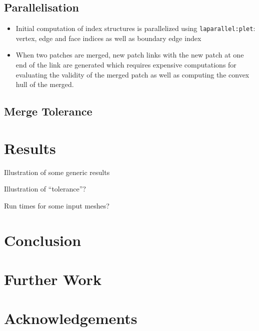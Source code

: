 \documentclass[format=sigconf]{acmart}
\begin{document}
\subsection{Parallelisation}

\begin{itemize}
\item Initial computation of index structures is parallelized using \texttt{laparallel:plet}: vertex, edge and face indices as well as boundary edge index
\item When two patches are merged, new patch links with the new patch at one end of the link are generated which requires expensive computations for evaluating the validity of the merged patch as well as computing the convex hull of the merged.
\end{itemize}

\subsection{Merge Tolerance}

\section{Results}\label{results}

Illustration of some generic results

Illustration of ``tolerance''?

Run times for some input meshes?

\section{Conclusion}\label{conclusion}


\section{Further Work}\label{further-work}


\section{Acknowledgements}\label{acknowledgements}



\end{document}
